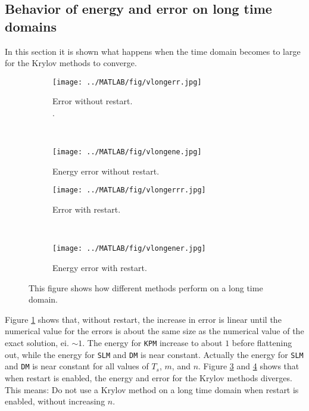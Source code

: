 \subsection{Behavior of energy and error on long time domains} %
In this section it is shown what happens when the time domain becomes to large for the Krylov methods to converge.
\label{sec:longtime}
\begin{figure}[H]
        \centering
        \begin{subfigure}[b]{0.3\textwidth}
                \texttt{[image: ../MATLAB/fig/vlongerr.jpg]}
                \caption{ Error without restart. \\. }
                \label{fig:vlongerr}
        \end{subfigure}
		~
		\begin{subfigure}[b]{0.3\textwidth}
                \texttt{[image: ../MATLAB/fig/vlongene.jpg]}
                \caption{ Energy error without restart. }
                \label{fig:vlongene}
        \end{subfigure}
        
        \begin{subfigure}[b]{0.3\textwidth}
                \texttt{[image: ../MATLAB/fig/vlongerrr.jpg]}
                \caption{ Error with restart. }
                \label{fig:vlongerrr}
        \end{subfigure}
		~
		\begin{subfigure}[b]{0.3\textwidth}
                \texttt{[image: ../MATLAB/fig/vlongener.jpg]}
                \caption{ Energy error with restart. }
                \label{fig:vlongener}
        \end{subfigure}
        \caption{ This figure shows how different methods perform on a long time domain. }
        \label{fig:vlong}
\end{figure}
\noindent Figure \ref{fig:vlongerr} shows that, without restart, the increase in error is linear until the numerical value for the errors is about the same size as the numerical value of the exact solution, ei. $\sim 1$. The energy for \texttt{KPM} increase to about $1$ before flattening out, while the energy for \texttt{SLM} and \texttt{DM} is near constant. Actually the energy for \texttt{SLM} and \texttt{DM} is near constant for all values of $T_s$, $m$, and $n$.
Figure \ref{fig:vlongerrr} and \ref{fig:vlongener} shows that when restart is enabled, the energy and error for the Krylov methods diverges. This means: Do not use a Krylov method on a long time domain when restart is enabled, without increasing $n$. \\

